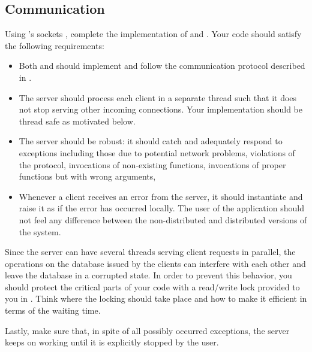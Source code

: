 \documentclass[a4paper]{article}
\begin{document}
\subsection{Communication} 
Using \python's sockets \cite{python-ipc}, complete the implementation of
 and . Your code should satisfy the
following requirements:
\begin{itemize}

  \item Both  and  should implement and
  follow the communication protocol described in .

  \item The server should process each client in a separate thread such that it
  does not stop serving other incoming connections. Your implementation should
  be thread safe as motivated below.

  \item The server should be robust: it should catch and adequately respond to
  exceptions including those due to potential network problems, violations of
  the protocol, invocations of non-existing functions, invocations of proper
  functions but with wrong arguments, \etc

  \item Whenever a client receives an error from the server, it should
  instantiate and raise it as if the error has occurred locally. The user of the
   application should not feel any difference between the
  non-distributed and distributed versions of the system.

\end{itemize}

Since the server can have several threads serving client requests in parallel,
the operations on the database issued by the clients can interfere with each
other and leave the database in a corrupted state. In order to prevent this
behavior, you should protect the critical parts of your code with a read/write
lock provided to you in . Think where the locking
should take place and how to make it efficient in terms of the waiting time.

Lastly, make sure that, in spite of all possibly occurred exceptions, the server
keeps on working until it is explicitly stopped by the user.
\end{document}
